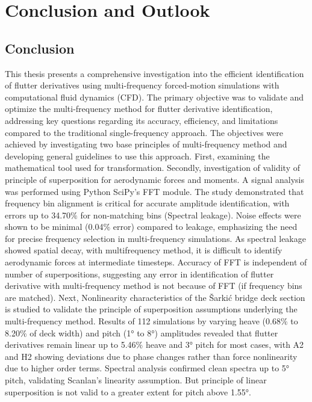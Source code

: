 \documentclass[../main]{subfiles}
\begin{document}
\chapter{Conclusion and Outlook}
\label{cha:conclusion}

\section{Conclusion}
This thesis presents a comprehensive investigation into the efficient identification of 
flutter derivatives using multi-frequency forced-motion simulations with computational fluid 
dynamics (CFD). The primary objective was to validate and optimize the multi-frequency method 
for flutter derivative identification, addressing key questions regarding its accuracy, efficiency, 
and limitations compared to the traditional single-frequency approach. The objectives were 
achieved by investigating two base principles of multi-frequency method and developing general guidelines to use this approach. 
First, examining the mathematical tool used for transformation. Secondly, investigation of validity of 
principle of superposition for aerodynamic forces and moments. 
A signal analysis was performed using Python SciPy's FFT module. The study demonstrated that frequency 
bin alignment is critical for accurate amplitude identification, with errors up to 34.70$\%$ 
for non-matching bins (Spectral leakage). Noise effects were shown to be minimal (0.04$\%$ error) compared 
to leakage, emphasizing the need for precise frequency selection in multi-frequency 
simulations. As spectral leakage showed spatial decay, with multifrequency method, 
it is difficult to identify aerodynamic forces at intermediate timesteps. Accuracy of FFT is independent of number of 
superpositions, suggesting any error in identification of flutter derivative with multi-frequency method
is not because of FFT (if frequency bins are matched). 
Next, Nonlinearity characteristics of the \v{S}arki\'c bridge deck section is studied to validate the principle of superposition 
assumptions underlying the multi-frequency method. 
Results of 112 simulations by varying heave (0.68$\%$ to 8.20$\%$ of deck width) and pitch (1° to 8°) amplitudes revealed 
that flutter derivatives remain linear up to 5.46$\%$ heave and 3° pitch for most cases, with 
A2 and H2 showing deviations due to phase changes rather than force nonlinearity due to higher order terms. 
Spectral analysis confirmed clean spectra up to 5° pitch, validating Scanlan's linearity assumption. 
But principle of linear superposition is not valid to a greater extent for pitch above 1.55°. 
\end{document}
